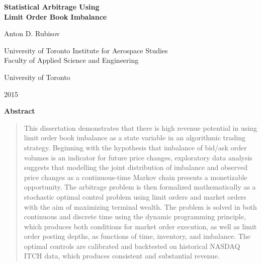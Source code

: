 \vspace*{0.25in}

\begin{center}
	{\Large\bf Statistical Arbitrage Using \\ Limit Order Book Imbalance \par}
	{\large Anton D. Rubisov \par}
	{University of Toronto Institute for Aerospace Studies}\\
    {Faculty of Applied Science and Engineering}\\
	{University of Toronto \par}
	{2015}
\end{center}
\vspace{0.25in}	
{\Large\bf Abstract}
\vspace{0.25in}

\begin{quote}
This dissertation demonstrates that there is high revenue potential in using limit order book imbalance as a state variable in an algorithmic trading strategy. Beginning with the hypothesis that imbalance of bid/ask order volumes is an indicator for future price changes, exploratory data analysis suggests that modelling the joint distribution of imbalance and observed price changes as a continuous-time Markov chain presents a monetizable opportunity. The arbitrage problem is then formalized mathematically as a stochastic optimal control problem using limit orders and market orders with the aim of maximizing terminal wealth. The problem is solved in both continuous and discrete time using the dynamic programming principle, which produces both conditions for market order execution, as well as limit order posting depths, as functions of time, inventory, and imbalance. The optimal controls are calibrated and backtested on historical NASDAQ ITCH data, which produces consistent and substantial revenue.
\end{quote}